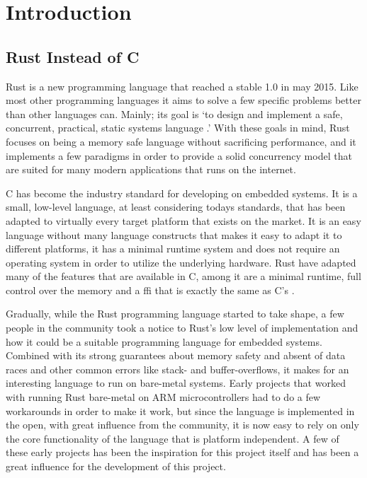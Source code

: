
\chapter{Introduction}
\label{chap:intro}

\section{Rust Instead of C} %
\label{sec:intro:rust_as_replacement_to_c}


Rust is a new programming language that reached a stable 1.0 in may 2015.
Like most other programming languages it aims to solve a few specific problems better than other languages can.
Mainly; its goal is `to design and implement a safe, concurrent, practical, static systems language \cite{web:rust_faq}.'
With these goals in mind, Rust focuses on being a memory safe language without sacrificing performance, and it implements a few paradigms in order to provide a solid concurrency model that are suited for many modern applications that runs on the internet.

C has become the industry standard for developing on embedded systems.
It is a small, low-level language, at least considering todays standards, that has been adapted to virtually every target platform that exists on the market.
It is an easy language without many language constructs that makes it easy to adapt it to different platforms, it has a minimal runtime system and does not require an operating system in order to utilize the underlying hardware.
Rust have adapted many of the features that are available in C, among it are a minimal runtime, full control over the memory and a \gls{ffi} that is exactly the same as C's \cite{web:rust_run_once_run_everywhere}.

Gradually, while the Rust programming language started to take shape, a few people in the community took a notice to Rust's low level of implementation and how it could be a suitable programming language for embedded systems.
Combined with its strong guarantees about memory safety and absent of data races and other common errors like stack- and buffer-overflows, it makes for an interesting language to run on bare-metal systems.
Early projects that worked with running Rust bare-metal on ARM microcontrollers had to do a few workarounds in order to make it work, but since the language is implemented in the open, with great influence from the community, it is now easy to rely on only the core functionality of the language that is platform independent.
A few of these early projects has been the inspiration for this project itself and has been a great influence for the development of this project.

